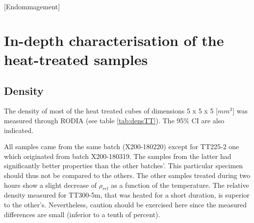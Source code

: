 [Endommagement]

\section{In-depth characterisation of the heat-treated samples}
\label{RCHTS}

\subsection{Density}
The density of most of the heat treated cubes of dimensions 5 x 5 x 5 [$mm^3$] was measured through RODIA (see table \ref{tab:densTT}). The 95\% CI are also indicated.\\

 \begin{center}
\begin{table}[ht]
\noindent{}

\caption[RODIA relative density results for the heat treated cubes]{RODIA relative density results for the heat treated cubes}
\label{tab:densTT}
\end{table}
 \end{center}

All samples came from the same batch (X200-180220) except for TT225-2 one which originated from batch X200-180319. The samples from the latter had significantly better properties than the other batches'. This particular specimen should thus not be compared to the others. The other samples treated during two hours show a slight decrease of $\rho_{rel}$ as a function of the temperature. The relative density measured for TT300-5m, that was heated for a short duration, is superior to the other's. Nevertheless, caution should be exercised here since the measured differences are small (inferior to a tenth of percent). 

